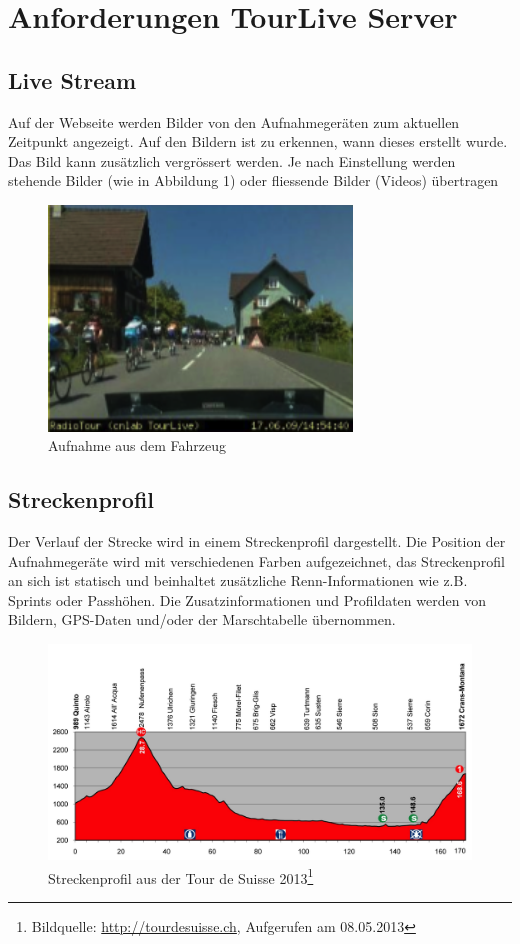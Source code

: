 \section{Anforderungen TourLive Server}
\label{sec:tourliveusecase}
\subsection{Live Stream}
Auf der Webseite werden Bilder von den Aufnahmegeräten zum aktuellen Zeitpunkt angezeigt. Auf den Bildern ist zu erkennen, wann dieses erstellt wurde. Das Bild kann zusätzlich vergrössert werden. Je nach Einstellung werden stehende Bilder (wie in Abbildung 1) oder fliessende Bilder (Videos) übertragen
\begin{figure}[H]
	\centering
	\includegraphics[height=60mm]{images/tourliveweb/tourliveaufnahme.png}
	\caption{Aufnahme aus dem Fahrzeug}
\end{figure}

\subsection{Streckenprofil}
Der Verlauf der Strecke wird in einem Streckenprofil dargestellt. Die Position der Aufnahmegeräte wird mit verschiedenen Farben aufgezeichnet, das Streckenprofil an sich ist statisch und beinhaltet zusätzliche Renn-Informationen wie z.B. Sprints oder Passhöhen. Die Zusatzinformationen und Profildaten werden von Bildern, GPS-Daten und/oder der Marschtabelle übernommen.
\begin{figure}[H]
	\centering
	\includegraphics[width=130mm]{images/tourliveweb/streckenprofil.jpg}
	\caption{Streckenprofil aus der Tour de Suisse 2013\footnote{Bildquelle: \url{http://tourdesuisse.ch}, Aufgerufen am 08.05.2013}}
\end{figure}

